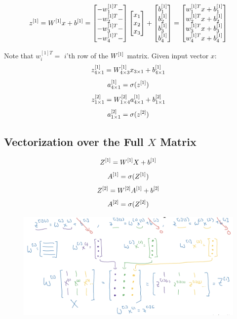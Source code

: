 $$
z^{[1]} = W^{[1]}x+b^{[1]} = \begin{bmatrix}
- w_1^{[1]T} -\\
- w_2^{[1]T} -\\
- w_3^{[1]T} -\\
- w_4^{[1]T} -
\end{bmatrix}
\begin{bmatrix}
x_1 \\
x_2 \\
x_3
\end{bmatrix} +
\begin{bmatrix}
b_1^{[1]}\\
b_2^{[1]}\\
b_3^{[1]}\\
b_4^{[1]}
\end{bmatrix}=
\begin{bmatrix}
w_1^{[1]T}x+b_1^{[1]}\\
w_2^{[1]T}x+b_2^{[1]}\\
w_3^{[1]T}x+b_3^{[1]}\\
w_4^{[1]T}x+b_4^{[1]}
\end{bmatrix}
$$

Note that $w_i^{[1]T} = $ $i$'th row of the $W^{[1]}$ matrix.  
Given input vector $x$: 
$$
z^{[1]}_{4\times 1} = W^{[1]}_{4 \times 3}x_{3\times 1} + b^{[1]}_{4 \times 1}
$$
$$
a^{[1]}_{4\times 1} = \sigma(z^{[1]})
$$
$$
z^{[2]}_{1\times 1} = W^{[2]}_{1\times 4}a^{[1]}_{4\times 1} + b^{[2]}_{1\times 1}
$$
$$
a^{[2]}_{1\times 1} = \sigma(z^{[2]})
$$
\subsection{Vectorization over the Full $X$ Matrix}
$$
Z^{[1]} = W^{[1]}X + b^{[1]}
$$
$$
A^{[1]} = \sigma(Z^{[1]})
$$
$$
Z^{[2]} = W^{[2]}A^{[1]} + b^{[2]}
$$
$$
A^{[2]} = \sigma(Z^{[2]})
$$

\begin{figure}[h]
\includegraphics[scale=0.15]{images/justif.png}
\centering
\end{figure}

